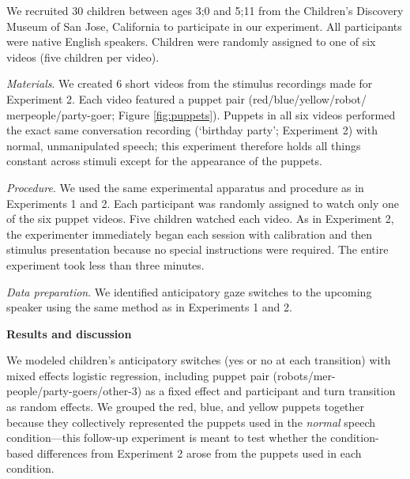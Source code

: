 \documentclass[authoryear, 12pt]{elsarticle}
\begin{document}
\noindent We recruited 30 children between ages 3;0 and 5;11 from the Children's Discovery Museum of San Jose, California to participate in our experiment. All participants were native English speakers. Children were randomly assigned to one of six videos (five children per video).

\medskip
\noindent \textit{Materials}. We created 6 short videos from the stimulus recordings made for Experiment 2. Each video featured a puppet pair (red/blue/yellow/robot/ merpeople/party-goer; Figure \ref{fig:puppets}). Puppets in all six videos performed the exact same conversation recording (`birthday party'; Experiment 2) with normal, unmanipulated speech; this experiment therefore holds all things constant across stimuli except for the appearance of the puppets.
 
\medskip
\noindent \textit{Procedure}. We used the same experimental apparatus and procedure as in Experiments 1 and 2. Each participant was randomly assigned to watch only one of the six puppet videos. Five children watched each video. As in Experiment 2, the experimenter immediately began each session with calibration and then stimulus presentation because no special instructions were required. The entire experiment took less than three minutes.

\medskip
\noindent \textit{Data preparation}. We identified anticipatory gaze switches to the upcoming speaker using the same method as in Experiments 1 and 2.

\bigskip
\noindent \textbf{Results and discussion}
\medskip

\noindent We modeled children's anticipatory switches (yes or no at each transition) with mixed effects logistic regression, including puppet pair (robots/mer- people/party-goers/other-3) as a fixed effect and participant and turn transition as random effects. We grouped the red, blue, and yellow puppets together because they collectively represented the puppets used in the \textit{normal} speech condition---this follow-up experiment is meant to test whether the condition-based differences from Experiment 2 arose from the puppets used in each condition.
\end{document}

